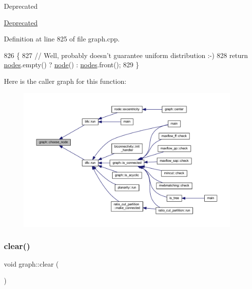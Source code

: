 \begin{DoxyRefDesc}{Deprecated}
\item[\mbox{\hyperlink{deprecated__deprecated000005}{Deprecated}}]\end{DoxyRefDesc}


Definition at line 825 of file graph.\+cpp.


\begin{DoxyCode}
826 \{
827     \textcolor{comment}{// Well, probably doesn't guarantee uniform distribution :-)}
828     \textcolor{keywordflow}{return} \mbox{\hyperlink{classgraph_a4ea0592e8eb7c26c5abad24546907726}{nodes}}.empty() ? \mbox{\hyperlink{classnode}{node}}() : \mbox{\hyperlink{classgraph_a4ea0592e8eb7c26c5abad24546907726}{nodes}}.front();
829 \}
\end{DoxyCode}
Here is the caller graph for this function\+:\nopagebreak
\begin{figure}[H]
\begin{center}
\leavevmode
\includegraphics[width=350pt]{classgraph_aec5c11c90a94ebd145f059a541db860e_icgraph}
\end{center}
\end{figure}
\mbox{\label{classgraph_a9ff5d6af3653e79f87b836701453f55a}} 
\subsubsection{\texorpdfstring{clear()}{clear()}}
{\footnotesize\ttfamily void graph\+::clear (\begin{DoxyParamCaption}{ }\end{DoxyParamCaption})\hspace{0.3cm}{\ttfamily [inherited]}}

